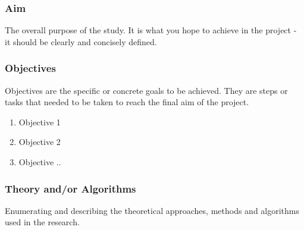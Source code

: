 \documentclass[aspectratio=169]{beamer}
\begin{document}


\begin{frame}
    \frametitle{Aim}
    
    The overall purpose of the study. It is what you hope to achieve in the project - it should be clearly and concisely defined.
\end{frame}




\begin{frame}
    \frametitle{Objectives}

    Objectives are the specific or concrete goals to be achieved. They are steps or tasks that needed to be taken to reach the final aim of the project.

    \begin{enumerate}
        \item Objective 1
        \item Objective 2
        \item Objective ..
    \end{enumerate}    
\end{frame}


\begin{frame}
    \frametitle{Theory and/or Algorithms}
    
    Enumerating and describing the theoretical approaches, methods and algorithms used in the research.

\end{frame}

\end{document}
